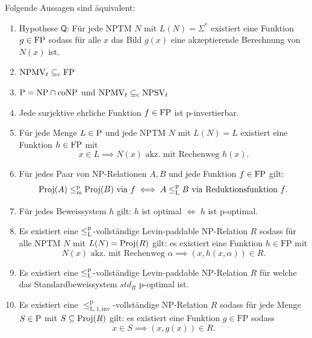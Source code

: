 \begin{theorem}\label{thm:q}
    Folgende Aussagen sind äquivalent:
    \begin{enumerate}
        \item Hypothese $\mathsf{Q}$: Für jede NPTM $N$ mit $L(N)=\Sigma^*$ existiert eine Funktion $g\in\FP$ sodass für alle $x$ das Bild $g(x)$ eine akzeptierende Berechnung von $N(x)$ ist.
        \item $\mathrm{NPMV}_t\subseteqc \mathrm{FP}$
        \item $\P=\NP\cap\coNP$ und $\mathrm{NPMV}_t\subseteqc \mathrm{NPSV}_t$
        \item Jede surjektive ehrliche Funktion $f\in\FP$ ist p-invertierbar. %
        \item Für jede Menge $L\in \P$  und jede NPTM $N$ mit $L(N)=L$ existiert eine Funktion $h\in \FP$ mit 
            \[ x\in L \implies N(x) \text{ akz. mit Rechenweg $h(x)$}. \]
        \item Für jedes Paar von NP-Relationen $A, B$ und jede Funktion $f\in\FP$ gilt:
            \[ \Proj(A) \leqmp \Proj(B) \text{ via $f$} \iff A \leqlp B \text{ via Reduktionsfunktion $f$}. \]
        \item Für jedes Beweissystem $h$ gilt: $h$ ist optimal $\iff$ $h$ ist p-optimal. 
        \item Es existiert eine $\leqlp$-vollständige Levin-paddable NP-Relation $R$ sodass für alle NPTM $N$ mit $L(N)=\Proj(R)$ gilt: es existiert eine Funktion $h\in\mathrm{FP}$ mit
            \[ N(x) \text{ akz. mit Rechenweg $\alpha$} \implies (x,h(x,\alpha))\in R. \]
        \item Es existiert eine $\leqlp$-vollständige Levin-paddable NP-Relation $R$ für welche das Standardbeweissystem $\mathit{std}_R$ p-optimal ist.
        \item Es existiert eine $\leq_\mathrm{L,1,inv}^\mathrm p$-vollständige NP-Relation $R$ sodass für jede Menge $S\in \P$ mit $S\subseteq \Proj(R)$ gilt: es existiert eine Funktion $g\in\mathrm{FP}$ sodass
            \[ x\in S \implies (x, g(x))\in R. \]
    \end{enumerate}
\end{theorem}
